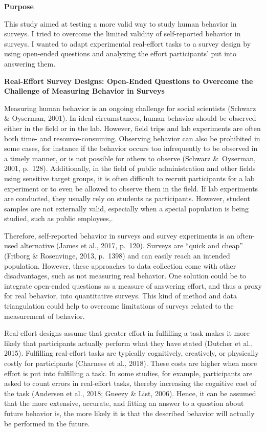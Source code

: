 \documentclass{article}
\begin{document}
\textbf{Purpose}

This study aimed at testing a more valid way to study human behavior in surveys. I tried to overcome the limited validity of self-reported behavior in surveys. I wanted to adapt experimental real-effort tasks to a survey design by using open-ended questions and analyzing the effort participants' put into answering them.

\textbf{}

\textbf{Real-Effort Survey Designs: Open-Ended Questions to Overcome the Challenge of Measuring Behavior in Surveys}

Measuring human behavior is an ongoing challenge for social scientists (Schwarz \& Oyserman, 2001). In ideal circumstances, human behavior should be observed either in the field or in the lab. However, field trips and lab experiments are often both time- and resource-consuming. Observing behavior can also be prohibited in some cases, for instance if the behavior occurs too infrequently to be observed in a timely manner, or is not possible for others to observe (Schwarz \& Oyserman, 2001, p. 128). Additionally, in the field of public administration and other fields using sensitive target groups, it is often difficult to recruit participants for a lab experiment or to even be allowed to observe them in the field. If lab experiments are conducted, they usually rely on students as participants. However, student samples are not externally valid, especially when a special population is being studied, such as public employees,. 

Therefore, self-reported behavior in surveys and survey experiments is an often-used alternative (James et al., 2017, p. 120). Surveys are “quick and cheap” (Friborg \& Rosenvinge, 2013, p. 1398) and can easily reach an intended population. However, these approaches to data collection come with other disadvantages, such as not measuring real behavior. One solution could be to integrate open-ended questions as a measure of answering effort, and thus a proxy for real behavior, into quantitative surveys. This kind of method and data triangulation could help to overcome limitations of surveys related to the measurement of behavior. 

Real-effort designs assume that greater effort in fulfilling a task makes it more likely that participants actually perform what they have stated (Dutcher et al., 2015). Fulfilling real-effort tasks are typically cognitively, creatively, or physically costly for participants (Charness et al., 2018). These costs are higher when more effort is put into fulfilling a task. In some studies, for example, participants are asked to count errors in real-effort tasks, thereby increasing the cognitive cost of the task (Andersen et al., 2018; Gneezy \& List, 2006). Hence, it can be assumed that the more extensive, accurate, and fitting an answer to a question about future behavior is, the more likely it is that the described behavior will actually be performed in the future. 
\end{document}
